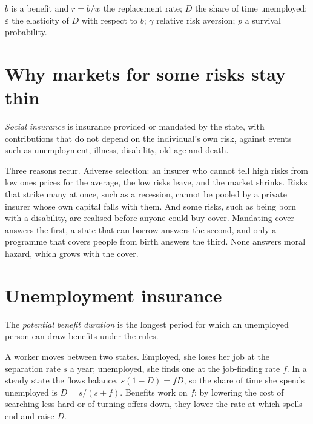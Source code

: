 \begin{notation}\label{not:b3:social-insurance:symbols}
$b$ is a benefit and $r = b/w$ the replacement rate; $D$ the share of time unemployed;
$\varepsilon$ the elasticity of $D$ with respect to $b$; $\gamma$ relative risk aversion; $p$ a survival
probability.
\end{notation}

\section{Why markets for some risks stay thin}\label{sec:b3:social-insurance:why}

\begin{definition}\label{def:b3:social-insurance:social-insurance}
\emph{Social insurance} is insurance provided or mandated by the state, with
contributions that do not depend on the individual's own risk, against events such
as unemployment, illness, disability, old age and death.
\end{definition}

Three reasons recur. Adverse selection: an insurer who cannot tell high risks from
low ones prices for the average, the low risks leave, and the market shrinks. Risks
that strike many at once, such as a recession, cannot be pooled by a private insurer
whose own capital falls with them. And some risks, such as being born with a
disability, are realised before anyone could buy cover. Mandating cover answers the
first, a state that can borrow answers the second, and only a programme that
covers people from birth answers the third. None answers moral hazard, which
grows with the cover.

\section{Unemployment insurance}\label{sec:b3:social-insurance:ui}

\begin{definition}\label{def:b3:social-insurance:benefit-duration}
The \emph{potential benefit duration} is the longest period for which an unemployed
person can draw benefits under the rules.
\end{definition}

A worker moves between two states. Employed, she loses her job at the separation
rate $s$ a year; unemployed, she finds one at the job-finding rate $f$. In a steady
state the flows balance, $s(1 - D) = fD$, so the share of time she spends unemployed is
$D = s/(s + f)$. Benefits work on $f$: by lowering the cost of searching less hard or
of turning offers down, they lower the rate at which spells end and raise $D$.

